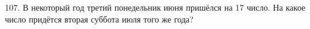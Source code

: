 107. В некоторый год третий понедельник июня пришёлся на 17 число. На какое число придётся вторая суббота июля того же года?\\
